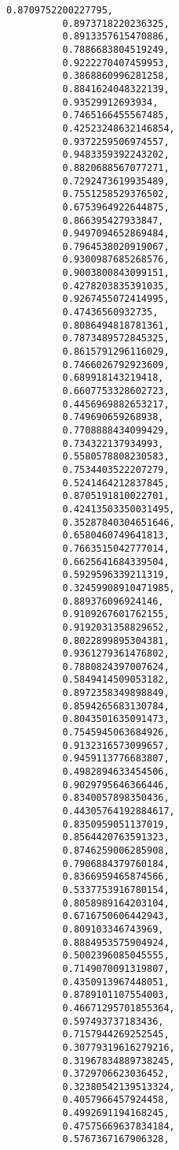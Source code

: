 \documentclass[11pt]{article}
\begin{document}
\begin{Verbatim}[commandchars=\\\{\}]
          0.8709752200227795,
          0.8973718220236325,
          0.8913357615470886,
          0.7886683804519249,
          0.9222270407459953,
          0.3868860996281258,
          0.8841624048322139,
          0.93529912693934,
          0.7465166455567485,
          0.42523248632146854,
          0.9372259506974557,
          0.9483359392243202,
          0.8820688567077271,
          0.7292473619935489,
          0.7551258529376502,
          0.6753964922644875,
          0.866395427933847,
          0.9497094652869484,
          0.7964538020919067,
          0.9300987685268576,
          0.9003800843099151,
          0.4278203835391035,
          0.9267455072414995,
          0.47436560932735,
          0.8086494818781361,
          0.7873489572845325,
          0.8615791296116029,
          0.7466026792923609,
          0.689918143219418,
          0.6607753328602723,
          0.4456969882653217,
          0.749690659268938,
          0.7708888434099429,
          0.734322137934993,
          0.5580578808230583,
          0.7534403522207279,
          0.5241464212837845,
          0.8705191810022701,
          0.42413503350031495,
          0.35287840304651646,
          0.6580460749641813,
          0.7663515042777014,
          0.6625641684339504,
          0.5929596339211319,
          0.32459908910471985,
          0.889376096924146,
          0.9109267601762155,
          0.9192031358829652,
          0.8022899895304381,
          0.9361279361476802,
          0.7880824397007624,
          0.5849414509053182,
          0.8972358349898849,
          0.8594265683130784,
          0.8043501635091473,
          0.7545945063684926,
          0.9132316573099657,
          0.9459113776683807,
          0.4982894633454506,
          0.9029795646366446,
          0.8340057898350436,
          0.44305764192884617,
          0.8350959051137019,
          0.8564420763591323,
          0.8746259006285908,
          0.7906884379760184,
          0.8366959465874566,
          0.5337753916780154,
          0.8058989164203104,
          0.6716750606442943,
          0.809103346743969,
          0.8884953575904924,
          0.5002396085045555,
          0.7149070091319807,
          0.4350913967448051,
          0.8789101107554003,
          0.46671295701855364,
          0.597493737183436,
          0.7157944269252545,
          0.30779319616279216,
          0.31967834889738245,
          0.3729706623036452,
          0.32380542139513324,
          0.4057966457924458,
          0.4992691194168245,
          0.47575669637834184,
          0.5767367167906328,

\end{Verbatim}
\end{document}
